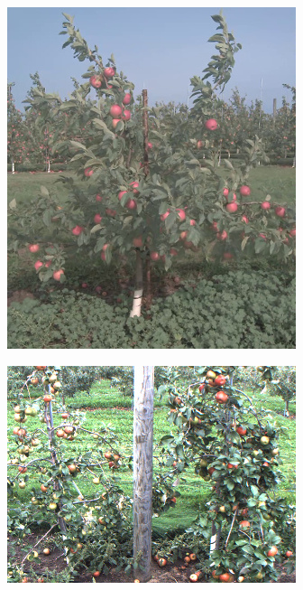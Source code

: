 \begin{figure}[!h]
        \centering

        \begin{subfigure}[t]{.35\textwidth}
                \includegraphics[width=\textwidth]{figures/isfm/dataset11.jpg}
                \label{fig:dataset1}
        \end{subfigure}\quad \begin{subfigure}[t]{.55\textwidth}
                \includegraphics[width=\textwidth]{figures/isfm/dataset21.jpg}
                \label{fig:dataset2}
        \end{subfigure}
       

\end{figure}

